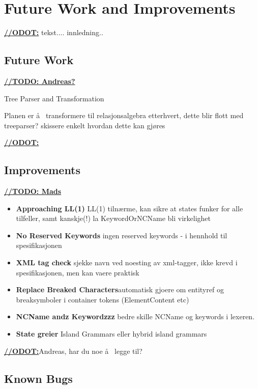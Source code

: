 \chapter{Future Work and Improvements}
\label{sect:summary:future_work}
\underline{\textbf{\LARGE //ODOT:}} tekst.... innledning..


\section{Future Work}
\underline{\textbf{\LARGE //TODO: Andreas?}}

Tree Parser and Transformation

Planen er \aa~ transformere til relasjonsalgebra etterhvert, dette blir flott med treeparser? skissere enkelt hvordan dette kan gj\o res

\underline{\textbf{\LARGE //ODOT:}}

\section{Improvements}
\underline{\textbf{\LARGE //TODO: Mads}} 

\begin{itemize}
\item \textbf{Approaching LL(1)} LL(1) tiln\ae rme, kan sikre at states funker for alle tilfeller, samt kanskje(!) la KeywordOrNCName bli virkelighet

\item \textbf{No Reserved Keywords}  ingen reserved keywords - i hennhold til spesifikasjonen

\item \textbf{XML tag check} sjekke navn ved noesting av xml-tagger, ikke krevd i spesifikasjonen, men kan vaere praktisk

\item \textbf{Replace Breaked Characters}automatisk gjoere om entityref og breaksymboler i container tokens (ElementContent etc)

\item \textbf{NCName andz Keywordzzz} bedre skille NCName og keywords i lexeren.

\item \textbf{State greier} Island Grammars eller hybrid island grammars

\end{itemize}

\underline{\textbf{\LARGE //ODOT:}}Andreas, har du noe \aa~ legge til?

\section{Known Bugs}
\label{sect:future:knownBugs}


